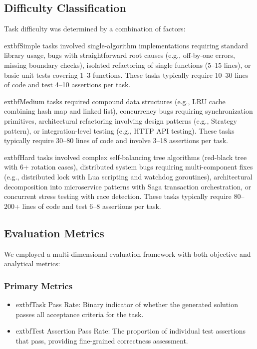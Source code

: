 \documentclass[conference]{IEEEtran}
\begin{document}
\subsection{Difficulty Classification}

Task difficulty was determined by a combination of factors:

			extbf{Simple tasks} involved single-algorithm implementations requiring standard library usage, bugs with straightforward root causes (e.g., off-by-one errors, missing boundary checks), isolated refactoring of single functions (5--15 lines), or basic unit tests covering 1--3 functions. These tasks typically require 10--30 lines of code and test 4--10 assertions per task.

			extbf{Medium tasks} required compound data structures (e.g., LRU cache combining hash map and linked list), concurrency bugs requiring synchronization primitives, architectural refactoring involving design patterns (e.g., Strategy pattern), or integration-level testing (e.g., HTTP API testing). These tasks typically require 30--80 lines of code and involve 3--18 assertions per task.

			extbf{Hard tasks} involved complex self-balancing tree algorithms (red-black tree with 6+ rotation cases), distributed system bugs requiring multi-component fixes (e.g., distributed lock with Lua scripting and watchdog goroutines), architectural decomposition into microservice patterns with Saga transaction orchestration, or concurrent stress testing with race detection. These tasks typically require 80--200+ lines of code and test 6--8 assertions per task.

\subsection{Evaluation Metrics}

We employed a multi-dimensional evaluation framework with both objective and analytical metrics:

\subsubsection{Primary Metrics}
\begin{itemize}[leftmargin=*]
 \item 			extbf{Task Pass Rate:} Binary indicator of whether the generated solution passes all acceptance criteria for the task.
 \item 			extbf{Test Assertion Pass Rate:} The proportion of individual test assertions that pass, providing fine-grained correctness assessment.
\end{itemize}
\end{document}
